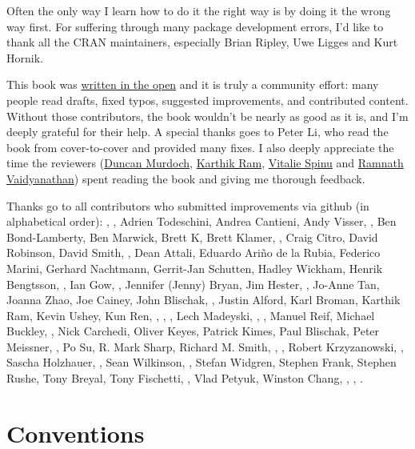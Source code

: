 \documentclass[]{book}
\begin{document}
Often the only way I learn how to do it the right way is by doing it the wrong way first. For suffering through many package development errors, I'd like to thank all the CRAN maintainers, especially Brian Ripley, Uwe Ligges and Kurt Hornik.

This book was \href{https://github.com/hadley/r-pkgs/}{written in the open} and it is truly a community effort: many people read drafts, fixed typos, suggested improvements, and contributed content. Without those contributors, the book wouldn't be nearly as good as it is, and I'm deeply grateful for their help. A special thanks goes to Peter Li, who read the book from cover-to-cover and provided many fixes. I also deeply appreciate the time the reviewers (\href{http://www.stats.uwo.ca/faculty/murdoch/}{Duncan Murdoch}, \href{http://karthik.io}{Karthik Ram}, \href{http://vitalie.spinu.info}{Vitalie Spinu} and \href{https://ramnathv.github.io}{Ramnath Vaidyanathan}) spent reading the book and giving me thorough feedback.

Thanks go to all contributors who submitted improvements via github (in alphabetical order): \citet{aaronwolen}, \citet{adessy}, Adrien Todeschini, Andrea Cantieni, Andy Visser, \citet{apomatix}, Ben Bond-Lamberty, Ben Marwick, Brett K, Brett Klamer, \citet{contravariant}, Craig Citro, David Robinson, David Smith, \citet{davidkane9}, Dean Attali, Eduardo Ariño de la Rubia, Federico Marini, Gerhard Nachtmann, Gerrit-Jan Schutten, Hadley Wickham, Henrik Bengtsson, \citet{heogden}, Ian Gow, \citet{jacobbien}, Jennifer (Jenny) Bryan, Jim Hester, \citet{jmarshallnz}, Jo-Anne Tan, Joanna Zhao, Joe Cainey, John Blischak, \citet{jowalski}, Justin Alford, Karl Broman, Karthik Ram, Kevin Ushey, Kun Ren, \citet{kwenzig}, \citet{kylelundstedt}, \citet{lancelote}, Lech Madeyski, \citet{lindbrook}, \citet{maiermarco}, Manuel Reif, Michael Buckley, \citet{MikeLeonard}, Nick Carchedi, Oliver Keyes, Patrick Kimes, Paul Blischak, Peter Meissner, \citet{PeterDee}, Po Su, R. Mark Sharp, Richard M. Smith, \citet{rmar073}, \citet{rmsharp}, Robert Krzyzanowski, \citet{ryanatanner}, Sascha Holzhauer, \citet{scharne}, Sean Wilkinson, \citet{SimonPBiggs}, Stefan Widgren, Stephen Frank, Stephen Rushe, Tony Breyal, Tony Fischetti, \citet{urmils}, Vlad Petyuk, Winston Chang, \citet{winterschlaefer}, \citet{wrathematics}, \citet{zhaoy}.

\hypertarget{intro-conventions}{%
\section{Conventions}\label{intro-conventions}}
\end{document}
